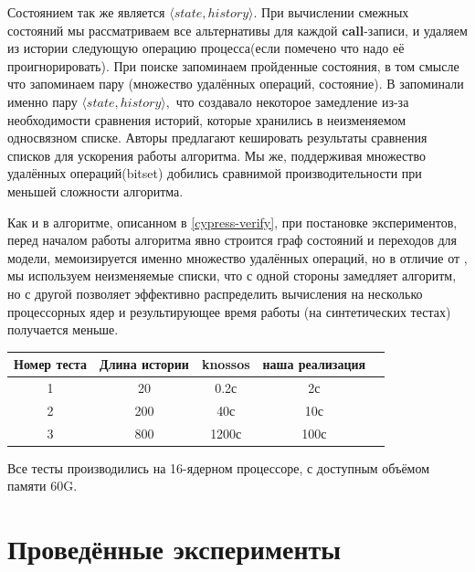 \documentclass[pdftex,ptm,14pt,a4paper]{extreport}
\theoremstyle{definition}
\begin{document}
Состоянием так же является $\langle state, history \rangle.$
При вычислении смежных состояний мы рассматриваем все альтернативы для каждой \textbf{call}-записи, и удаляем
из истории следующую операцию процесса(если помечено что надо её проигнорировать).
При поиске запоминаем пройденные состояния, в том смысле что запоминаем пару (множество удалённых операций, состояние).
В \cite{horn-faster} запоминали именно пару $\langle state, history \rangle,$ что создавало некоторое замедление из-за
необходимости сравнения историй, которые хранились в неизменяемом односвязном списке. Авторы предлагают кешировать результаты
сравнения списков для ускорения работы алгоритма. Мы же, поддерживая множество удалённых операций(bitset) добились сравнимой
производительности при меньшей сложности алгоритма.

Как и в алгоритме, описанном в \ref{cypress-verify}, при постановке экспериментов,
перед началом работы алгоритма явно строится граф состояний и переходов для модели,
мемоизируется именно множество удалённых операций, но в отличие от \cite{knossos}, мы
используем неизменяемые списки, что с одной стороны замедляет алгоритм, но с другой позволяет
эффективно распределить вычисления на несколько процессорных ядер и результирующее время работы
(на синтетических тестах) получается меньше.

\begin{center}
  \begin{tabular}{| c | c | c | c | c| }
      \hline
        Номер теста & Длина истории & knossos & наша реализация \\
        \hline
        1           & 20            & 0.2с     & 2с             \\
        \hline
        2           & 200           & 40с      & 10с              \\
        \hline
        3           & 800           & 1200с    & 100с              \\
        \hline
  \end{tabular}
\end{center}
Все тесты производились на 16-ядерном процессоре, с доступным объёмом памяти 60G.

\chapter{Проведённые эксперименты}
\end{document}
